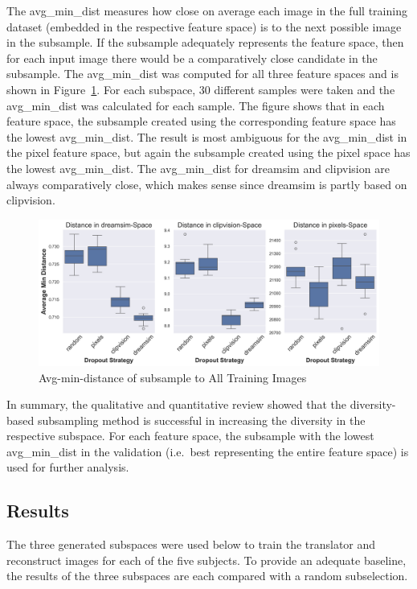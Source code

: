 The avg\_min\_dist measures how close on average each image in the full training dataset  (embedded in the respective feature space) is to the next possible image in the subsample. If the subsample adequately represents the feature space, then for each input image there would be a comparatively close candidate in the subsample. The avg\_min\_dist was computed for all three feature spaces and is shown in Figure~\ref{fig:dropout_avg_min_distance}. For each subspace, 30 different samples were taken and the avg\_min\_dist was calculated for each sample. The figure shows that in each feature space, the subsample created using the corresponding feature space has the lowest avg\_min\_dist. The result is most ambiguous for the avg\_min\_dist in the pixel feature space, but again the subsample created using the pixel space has the lowest avg\_min\_dist. The avg\_min\_dist for dreamsim and clipvision are always comparatively close, which makes sense since dreamsim is partly based on clipvision\cite{fuDreamSimLearningNew2023}. 

\begin{figure}[ht]
    \centering
    \includegraphics[width=1\textwidth]{plots/dropout_avg_min_distance.png}
    \caption{Avg-min-distance of subsample to All Training Images}\label{fig:dropout_avg_min_distance}
\end{figure}


In summary, the qualitative and quantitative review showed that the diversity-based subsampling method is successful in increasing the diversity in the respective subspace. For each feature space, the subsample with the lowest avg\_min\_dist in the validation (i.e.\ best representing the entire feature space) is used for further analysis.


\subsection{Results}
The three generated subspaces were used below to train the translator and reconstruct images for each of the five subjects. To provide an adequate baseline, the results of the three subspaces are each compared with a random subselection. 

